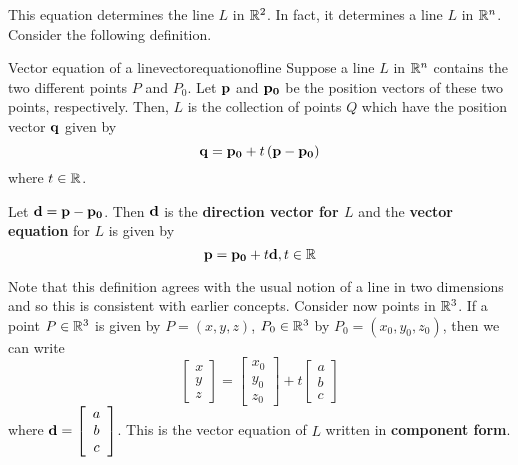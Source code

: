 This equation determines the line $L$ in $\mathbb{R}^2$. In fact, it determines a line $L$ in $\mathbb{R}^n$. Consider the following definition.

\begin{definition}{Vector equation of a line}{vectorequationofline}
Suppose a line $L$ in $\mathbb{R}^{n}$ contains the two different points $P$ and 
$P_0$. Let ${\bf p}$ and ${\bf p_0}$ be the position vectors of these two points, respectively.
Then, $L$ is the collection of points $Q$ which have the position vector ${\bf q}$ given by
\begin{equation*}
{\bf q}={\bf p_0}+t\left( {\bf p}-{\bf p_0}\right)
\end{equation*}
where $t\in \mathbb{R}$. 

Let ${\bf d} = {\bf p} - {\bf p_0}$. Then ${\bf d}$ is the \textbf{direction vector for $L$} and the \textbf{vector equation} for $L$ is given by 
\begin{equation*}
{\bf p}={\bf p_0}+t{\bf d}, t\in\mathbb{R}
\end{equation*}
\end{definition}

Note that this definition agrees with the usual notion of a
line in two dimensions and so this is consistent with earlier concepts. Consider now points in $\mathbb{R}^3$. If a point $P \in \mathbb{R}^3$ is given by $P = \left( x,y,z \right)$, $P_0 \in \mathbb{R}^3$ by $P_0 = \left( x_0, y_0, z_0 \right)$, then we can write
\begin{equation*}
\left[
\begin{array}{c}
x \\
y \\
z 
\end{array}
\right] = 
\left[
\begin{array}{c}
x_0 \\
y_0 \\
z_0 
\end{array}
\right]
+
t
\left[
\begin{array}{c}
a \\
b \\
c 
\end{array}
\right]
\end{equation*}
where ${\bf d} = \left[
\begin{array}{c}
a \\
b \\
c 
\end{array}
\right]$. This is the vector equation of $L$ written in \textbf{component form}.

